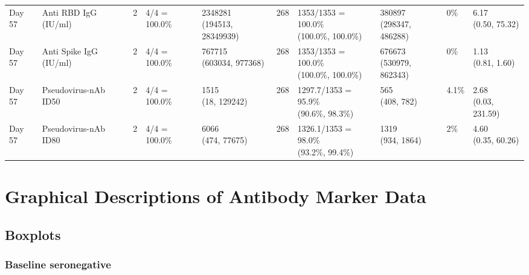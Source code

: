\documentclass[]{book}
\theoremstyle{definition}
\theoremstyle{definition}
\theoremstyle{definition}
\newcommand{\1}{\mathbbm{1}}
\begin{document}
\begin{landscape}
\begin{ThreePartTable}
\begin{longtable}[t]{>{\raggedright\arraybackslash}p{1cm}lllllllll}
Day 57 & Anti RBD IgG (IU/ml) & 2 & 4/4 = 100.0\% & \makecell[l]{2348281\\(194513, 28349939)} & 268 & \makecell[l]{1353/1353 = 100.0\%\\(100.0\%, 100.0\%)} & \makecell[l]{380897\\(298347, 486288)} & 0\% & \makecell[l]{6.17\\(0.50, 75.32)}\\
Day 57 & Anti Spike IgG (IU/ml) & 2 & 4/4 = 100.0\% & \makecell[l]{767715\\(603034, 977368)} & 268 & \makecell[l]{1353/1353 = 100.0\%\\(100.0\%, 100.0\%)} & \makecell[l]{676673\\(530979, 862343)} & 0\% & \makecell[l]{1.13\\(0.81, 1.60)}\\
Day 57 & Pseudovirus-nAb ID50 & 2 & 4/4 = 100.0\% & \makecell[l]{1515\\(18, 129242)} & 268 & \makecell[l]{1297.7/1353 = 95.9\%\\(90.6\%, 98.3\%)} & \makecell[l]{565\\(408, 782)} & 4.1\% & \makecell[l]{2.68\\(0.03, 231.59)}\\
Day 57 & Pseudovirus-nAb ID80 & 2 & 4/4 = 100.0\% & \makecell[l]{6066\\(474, 77675)} & 268 & \makecell[l]{1326.1/1353 = 98.0\%\\(93.2\%, 99.4\%)} & \makecell[l]{1319\\(934, 1864)} & 2\% & \makecell[l]{4.60\\(0.35, 60.26)}\\*
\end{longtable}
\end{ThreePartTable}


\clearpage
\end{landscape}

\hypertarget{ab-grapical}{%
\chapter{Graphical Descriptions of Antibody Marker Data}\label{ab-grapical}}

\hypertarget{boxplots}{%
\section{Boxplots}\label{boxplots}}

\hypertarget{baseline-seronegative}{%
\subsection{Baseline seronegative}\label{baseline-seronegative}}
\end{document}
